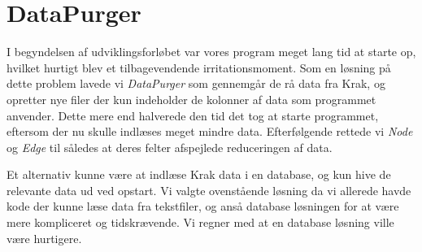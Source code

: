 \section{DataPurger}

I begyndelsen af udviklingsforløbet var vores program meget lang tid at starte op, hvilket hurtigt blev et tilbagevendende irritationsmoment. Som en løsning på dette problem lavede vi \emph{DataPurger} som gennemgår de rå data fra Krak, og opretter nye filer der kun indeholder de kolonner af data som programmet anvender. Dette mere end halverede den tid det tog at starte programmet, eftersom der nu skulle indlæses meget mindre data. Efterfølgende rettede vi \emph{Node} og \emph{Edge} til således at deres felter afspejlede reduceringen af data.

Et alternativ kunne være at indlæse Krak data i en database, og kun hive de relevante data ud ved opstart. Vi valgte ovenstående løsning da vi allerede havde kode der kunne læse data fra tekstfiler, og anså database løsningen for at være mere kompliceret og tidskrævende. Vi regner med at en database løsning ville være hurtigere.